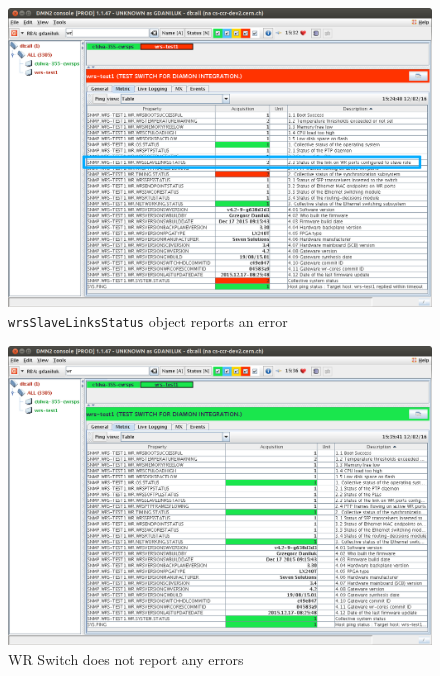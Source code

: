 \begin{figure}
  \begin{center}
    \includegraphics[width=.9\textwidth]{img/wrs_link_error.png}
    \caption{\texttt{wrsSlaveLinksStatus} object reports an error}
    \label{fig:diamon:slave_link_error}
  \end{center}
\end{figure}

\begin{figure}
  \begin{center}
    \includegraphics[width=.9\textwidth]{img/wrs_ok.png}
    \caption{WR Switch does not report any errors}
    \label{fig:diamon:wrs_ok}
  \end{center}
\end{figure}
